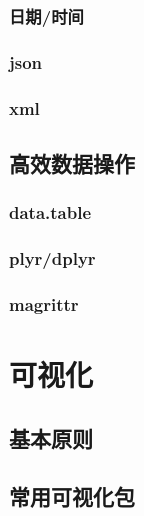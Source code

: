 \documentclass[]{book}
\begin{document}
\hypertarget{section-31}{%
\subsection{日期/时间}\label{section-31}}

\hypertarget{json-1}{%
\subsection{json}\label{json-1}}

\hypertarget{xml}{%
\subsection{xml}\label{xml}}

\hypertarget{section-32}{%
\section{高效数据操作}\label{section-32}}

\hypertarget{data.table}{%
\subsection{data.table}\label{data.table}}

\hypertarget{plyrdplyr}{%
\subsection{plyr/dplyr}\label{plyrdplyr}}

\hypertarget{magrittr}{%
\subsection{magrittr}\label{magrittr}}

\hypertarget{section-33}{%
\chapter{可视化}\label{section-33}}

\hypertarget{section-34}{%
\section{基本原则}\label{section-34}}

\hypertarget{section-35}{%
\section{常用可视化包}\label{section-35}}
\end{document}
